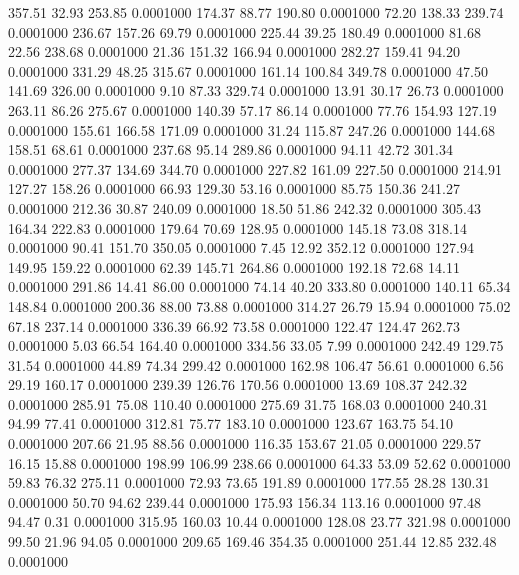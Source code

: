  357.51   32.93  253.85   0.0001000
 174.37   88.77  190.80   0.0001000
  72.20  138.33  239.74   0.0001000
 236.67  157.26   69.79   0.0001000
 225.44   39.25  180.49   0.0001000
  81.68   22.56  238.68   0.0001000
  21.36  151.32  166.94   0.0001000
 282.27  159.41   94.20   0.0001000
 331.29   48.25  315.67   0.0001000
 161.14  100.84  349.78   0.0001000
  47.50  141.69  326.00   0.0001000
   9.10   87.33  329.74   0.0001000
  13.91   30.17   26.73   0.0001000
 263.11   86.26  275.67   0.0001000
 140.39   57.17   86.14   0.0001000
  77.76  154.93  127.19   0.0001000
 155.61  166.58  171.09   0.0001000
  31.24  115.87  247.26   0.0001000
 144.68  158.51   68.61   0.0001000
 237.68   95.14  289.86   0.0001000
  94.11   42.72  301.34   0.0001000
 277.37  134.69  344.70   0.0001000
 227.82  161.09  227.50   0.0001000
 214.91  127.27  158.26   0.0001000
  66.93  129.30   53.16   0.0001000
  85.75  150.36  241.27   0.0001000
 212.36   30.87  240.09   0.0001000
  18.50   51.86  242.32   0.0001000
 305.43  164.34  222.83   0.0001000
 179.64   70.69  128.95   0.0001000
 145.18   73.08  318.14   0.0001000
  90.41  151.70  350.05   0.0001000
   7.45   12.92  352.12   0.0001000
 127.94  149.95  159.22   0.0001000
  62.39  145.71  264.86   0.0001000
 192.18   72.68   14.11   0.0001000
 291.86   14.41   86.00   0.0001000
  74.14   40.20  333.80   0.0001000
 140.11   65.34  148.84   0.0001000
 200.36   88.00   73.88   0.0001000
 314.27   26.79   15.94   0.0001000
  75.02   67.18  237.14   0.0001000
 336.39   66.92   73.58   0.0001000
 122.47  124.47  262.73   0.0001000
   5.03   66.54  164.40   0.0001000
 334.56   33.05    7.99   0.0001000
 242.49  129.75   31.54   0.0001000
  44.89   74.34  299.42   0.0001000
 162.98  106.47   56.61   0.0001000
   6.56   29.19  160.17   0.0001000
 239.39  126.76  170.56   0.0001000
  13.69  108.37  242.32   0.0001000
 285.91   75.08  110.40   0.0001000
 275.69   31.75  168.03   0.0001000
 240.31   94.99   77.41   0.0001000
 312.81   75.77  183.10   0.0001000
 123.67  163.75   54.10   0.0001000
 207.66   21.95   88.56   0.0001000
 116.35  153.67   21.05   0.0001000
 229.57   16.15   15.88   0.0001000
 198.99  106.99  238.66   0.0001000
  64.33   53.09   52.62   0.0001000
  59.83   76.32  275.11   0.0001000
  72.93   73.65  191.89   0.0001000
 177.55   28.28  130.31   0.0001000
  50.70   94.62  239.44   0.0001000
 175.93  156.34  113.16   0.0001000
  97.48   94.47    0.31   0.0001000
 315.95  160.03   10.44   0.0001000
 128.08   23.77  321.98   0.0001000
  99.50   21.96   94.05   0.0001000
 209.65  169.46  354.35   0.0001000
 251.44   12.85  232.48   0.0001000
